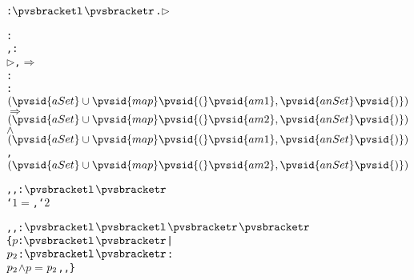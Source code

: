\begin{alltt}
  :  \({\pvsbracketl}\)\({\pvsbracketr}\).\pvsid{(}\(\rhd\)\pvsid{)}\vspace*{\pvsdeclspacing}

  : 
     \pvsid{(}, \pvsid{)}:
      \(\rhd\)\pvsid{(}, \pvsid{)} \(\Rightarrow\)
       \pvsid{(} \pvsid{(}\pvsid{)}:
            \pvsid{(}\pvsid{)}:
             \pvsid{(}\(\setsotheruniontwofn{\pvsid{aSet}}{\pvsid{map}\pvsid{(}\pvsid{am1}, \pvsid{anSet}\pvsid{)}}\)\pvsid{)} \(\Rightarrow\)
              \pvsid{(}\(\setsotheruniontwofn{\pvsid{aSet}}{\pvsid{map}\pvsid{(}\pvsid{am2}, \pvsid{anSet}\pvsid{)}}\)\pvsid{)} \(\wedge\)
               \pvsid{|-}\pvsid{(}\(\setsotheruniontwofn{\pvsid{aSet}}{\pvsid{map}\pvsid{(}\pvsid{am1}, \pvsid{anSet}\pvsid{)}}\),
                   \(\setsotheruniontwofn{\pvsid{aSet}}{\pvsid{map}\pvsid{(}\pvsid{am2}, \pvsid{anSet}\pvsid{)}}\)\pvsid{)}\pvsid{)}\vspace*{\pvsdeclspacing}

  \pvsid{(}, , \pvsid{)}: \({\pvsbracketl}\)\({\pvsbracketr}\) \pvskey{=}
       \pvsid{(}`\(1\) \(=\) \pvsid{)}  \pvsid{(}, `\(2\)\pvsid{)}   \vspace*{\pvsdeclspacing}

  \pvsid{(}, , \pvsid{)}: \({\pvsbracketl}\)\({\pvsbracketl}\)\({\pvsbracketr}\)\({\pvsbracketr}\) \pvskey{=}
      \{\(p\): \({\pvsbracketl}\)\({\pvsbracketr}\) |
           \pvsid{(}\(p\sb{2}\): \({\pvsbracketl}\)\({\pvsbracketr}\)\pvsid{)}:
            \pvsid{(}\(p\sb{2}\)\pvsid{)} \(\wedge\) \(p\) \(=\) \pvsid{(}\(p\sb{2}\), , \pvsid{)}\}\vspace*{\pvsdeclspacing}

  \end{alltt}

